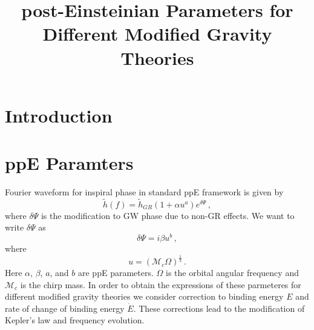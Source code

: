 \documentclass[11pt]{article}
\begin{document}
\title{post-Einsteinian Parameters for Different Modified Gravity Theories}
\maketitle
\section{Introduction}

\section{ppE Paramters}\label{section:intro}
\hspace*{15.5pt}Fourier waveform for inspiral phase in standard ppE framework is given by ~\cite{Yunes:2009ke}
\begin{equation}\label{eq:1}
\tilde{h}(f)=\tilde{h}_{GR}(1+\alpha u^a)e^{\delta\Psi}\,,
\end{equation}
where $\delta \Psi$ is the modification to GW phase due to non-GR effects. We want to write $\delta\Psi$ as 
\begin{equation}\label{eq:2}
\delta\Psi=i\beta u^b\,,
\end{equation}
where
\begin{equation}
u=(\mathcal{M}_c \Omega)^\frac{1}{3}\,.
\end{equation}
Here $\alpha$, $\beta$, $a$, and $b$ are ppE parameters. $\Omega$ is the orbital angular frequency and $\mathcal{M}_c$ is the chirp mass. In order to obtain the expressions of these parmeteres for different modified gravity theories we consider correction to binding energy $E$ and rate of change of binding energy $\dot{E}$. These corrections lead to the modification of Kepler's law and frequency evolution.\\
\end{document}
